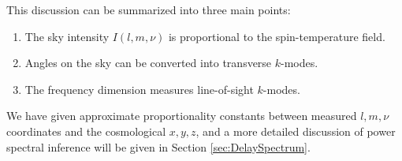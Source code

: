 This discussion can be summarized into three main points:
\begin{enumerate}
  \item The sky intensity $I(l,m,\nu)$ is proportional to the spin-temperature field. 
  \item Angles on the sky can be converted into transverse $k$-modes.
  \item The frequency dimension measures line-of-sight $k$-modes.
\end{enumerate}
We have given approximate proportionality constants between measured $l,m,\nu$ coordinates and 
the cosmological $x,y,z$, and a more detailed discussion of power spectral inference will be given
in Section \ref{sec:DelaySpectrum}.
